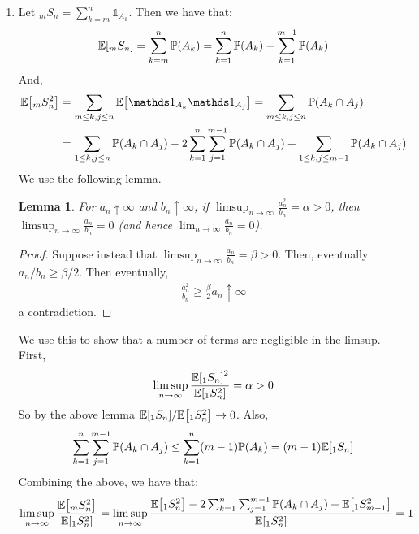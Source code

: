 \documentclass[12pt]{article}
\newtheorem{lemma}{Lemma}
\theoremstyle{definitionstyle}
\newcommand{\1}{\mathds 1}
\renewcommand{\P}{\mathbb P \qty}
\newcommand{\E}{\mathbb E \qty}
\begin{document}
\begin{enumerate}
        \item Let $_mS_n = \sum_{k=m}^n \1_{A_k}$. Then we have that:
        \begin{align*}
            \E[_mS_n] = \sum_{k=m}^n \P(A_k) = \sum_{k=1}^n \P(A_k) - \sum_{k=1}^{m-1} \P(A_k)
        \end{align*}
        And,
        \begin{align*}
            \E[_mS_n^2] &= \sum_{m \leq k,j \leq n} \E[\1_{A_k}\1_{A_j}] = \sum_{m \leq k,j \leq n} \P(A_k \cap A_j) \\
            &= \sum_{1 \leq k,j \leq n} \P(A_k \cap A_j) - 2\sum_{k=1}^n \sum_{j=1}^{m-1} \P(A_k \cap A_j) + \sum_{1 \leq k,j \leq m-1} \P(A_k \cap A_j) 
        \end{align*}
        We use the following lemma.
        \begin{lemma}
            For $a_n \uparrow \infty$ and $b_n \uparrow \infty$, if $\limsup_{n \to \infty} \frac{a_n^2}{b_n} = \alpha > 0$, then $\limsup_{n \to \infty} \frac{a_n}{b_n} = 0$ (and hence $\lim_{n \to \infty} \frac{a_n}{b_n} = 0$).
        \end{lemma}
        \begin{proof}
            Suppose instead that $\limsup_{n \to \infty} \frac{a_n}{b_n} = \beta > 0$. Then, eventually $a_n/b_n \geq \beta/2$. Then eventually,
            \begin{align*}
                \frac{a_n^2}{b_n} \geq \frac \beta 2 a_n \uparrow \infty
            \end{align*}
            a contradiction.
        \end{proof}
        We use this to show that a number of terms are negligible in the limsup. First,
        \begin{align*}
            \limsup_{n \to \infty} \frac{\E[_1S_n]^2}{\E[_1S_n^2]} = \alpha > 0
        \end{align*}
        So by the above lemma $\E[_1S_n]/\E[_1S_n^2] \to 0$. Also,
        \begin{align*}
            \sum_{k=1}^n \sum_{j=1}^{m-1} \P(A_k \cap A_j) \leq \sum_{k=1}^n (m-1)\P(A_k) = (m-1)\E[_1S_n]
        \end{align*}
        Combining the above, we have that:
        \begin{align*}
            \limsup_{n \to \infty} \frac{\E[_mS_n^2]}{\E[_1S_n^2]} = \limsup_{n \to \infty} \frac{\E[_1S_n^2] - 2\sum_{k=1}^n \sum_{j=1}^{m-1} \P(A_k \cap A_j) + \E[_1S_{m-1}^2]}{\E[_1S_n^2]} = 1
        \end{align*}

\end{enumerate}
\end{document}
